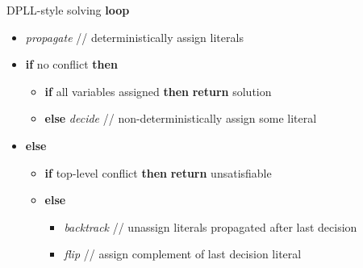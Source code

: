 \begin{frame}{DPLL-style solving}
  \bigskip
  \bigskip
  \textbf{loop}
  \begin{itemize}
  \item [] \textit{propagate}
    \hfill// deterministically assign literals
  \item [] \textbf{if} no conflict \textbf{then}
    \begin{itemize}
    \item [] \textbf{if} all variables assigned
      \textbf{then}
      \textbf{return} solution
    \item [] \textbf{else}
      \textit{decide}
      \hfill// non-deterministically assign some literal
    \end{itemize}
  \item [] \textbf{else}
    \begin{itemize}
    \item [] \textbf{if} top-level conflict
      \textbf{then}
      \textbf{return} unsatisfiable
    \item [] \textbf{else}
      \begin{itemize}
      \item [] \textit{backtrack} \hfill// unassign literals propagated after last decision
      \item [] \textit{flip} \hfill// assign complement of last decision literal
      \end{itemize}
    \end{itemize}
  \end{itemize}
\end{frame}
%
